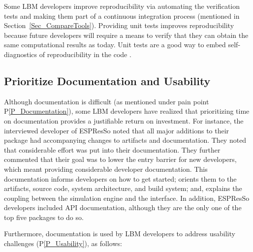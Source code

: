\documentclass[final, 3p, times, authoryear]{elsarticle}
\newcommand{\ppref}[1]{P\ref{#1}}
\begin{document}
Some LBM developers improve reproducibility via automating the verification
tests and making them part of a continuous integration process (mentioned in
Section~\ref{Sec_CompareTools}).  Providing unit tests improves reproducibility
because future developers will require a means to verify that they can obtain
the same computational results as today.  Unit tests are a good way to embed
self-diagnostics of reproducibility in the code \citep{BenureauAndRougier2017}.

\subsection{Prioritize Documentation and Usability} \label{Sec_RecommendDoc}

Although documentation is difficult (as mentioned under pain point
\ppref{P_Documentation}), some LBM developers have realized that prioritizing time
on documentation provides a justifiable return on investment. For instance, the
interviewed developer of ESPResSo noted that all major additions to their
package had accompanying changes to artifacts and documentation. They noted that
considerable effort was put into their documentation. They further commented
that their goal was to lower the entry barrier for new developers, which meant
providing considerable developer documentation. This documentation informs
developers on how to get started; orients them to the artifacts, source code,
system architecture, and build system; and, explains the coupling between
the simulation engine and the interface. In addition, ESPResSo developers
included API documentation, although they are the only one of the top five
packages to do so.

Furthermore, documentation is used by LBM developers to address usability
challenges (\ppref{P_Usability}), as follows:
\end{document}
